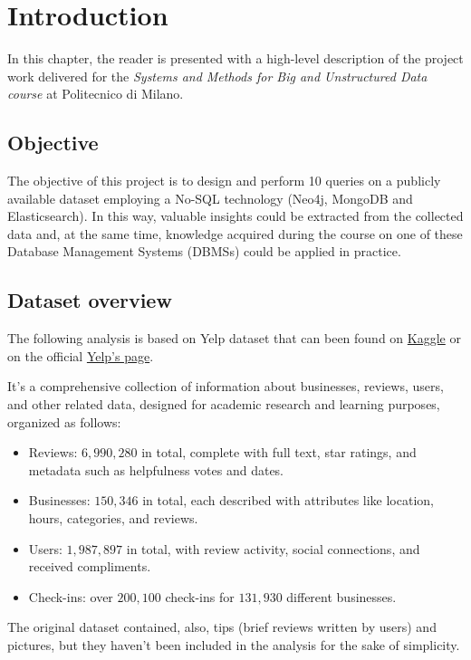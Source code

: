 \documentclass{Configuration_Files/PoliMi3i_thesis}
\begin{document}
\chapter{Introduction}
\label{ch:chapter_one}

In this chapter, the reader is presented with a high-level description of the project work delivered for the \textit{Systems and
Methods for Big and Unstructured Data course} at Politecnico di Milano.

\section{Objective}
\label{sec:Objective}
The objective of this project is to design and perform 10 queries on a publicly available dataset employing a No-SQL technology (Neo4j, MongoDB and Elasticsearch). In this way, valuable insights could be extracted from the collected data and, at the same time, knowledge acquired during the course on one of these Database Management Systems (DBMSs) could be applied in practice.

\section{Dataset overview}
The following analysis is based on Yelp dataset that can been found on \href{https://www.kaggle.com/datasets/yelp-dataset/yelp-dataset}{Kaggle} or on the official \href{https://www.yelp.com/dataset}{Yelp's page}. 

It's a comprehensive collection of information about businesses, reviews, users, and other related data, designed for academic research and learning purposes, organized as follows:
\begin{itemize}
    \item{Reviews}: $6,990,280$ in total, complete with full text, star ratings, and metadata such as helpfulness votes and dates.
    \item{Businesses}: $150,346$ in total, each described with attributes like location, hours, categories, and reviews.
    \item{Users}: $1,987,897$ in total, with review activity, social connections, and received compliments.
    \item{Check-ins}: over $200,100$ check-ins for $131,930$ different businesses.
\end{itemize}

The original dataset contained, also, tips (brief reviews written by users) and pictures, but they haven't  been included in the analysis for the sake of simplicity. 
\end{document}
